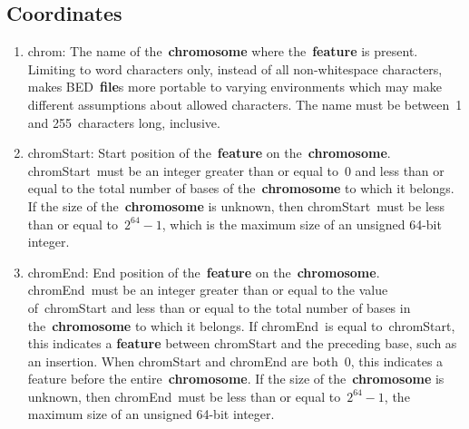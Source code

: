 \documentclass[11pt]{article}
\begin{document}
\subsection{Coordinates}
\begin{enumerate}
\item \textsf{chrom}: The name of the~\textbf{chromosome} where the~\textbf{feature} is present.
  Limiting to word characters only, instead of all non-whitespace characters, makes \ac{BED}~\textbf{file}s more portable to varying environments which may make different assumptions about allowed characters.
  The name must be between~1 and 255~characters long, inclusive.

\item \textsf{chromStart}: Start position of the~\textbf{feature} on the~\textbf{chromosome}.
  \textsf{chromStart}~must be an integer greater than or equal to~0 and less than or equal to the total number of bases of the~\textbf{chromosome} to which it belongs.
  If the size of the~\textbf{chromosome} is unknown, then \textsf{chromStart}~must be less than or equal to~$2^{64} - 1$, which is the maximum size of an unsigned 64-bit integer.

\item \textsf{chromEnd}: End position of the~\textbf{feature} on the~\textbf{chromosome}.
  \textsf{chromEnd}~must be an integer greater than or equal to the value of~\textsf{chromStart} and less than or equal to the total number of bases in the~\textbf{chromosome} to which it belongs.
  If \textsf{chromEnd}~is equal to~\textsf{chromStart}, this indicates a \textbf{feature} between \textsf{chromStart} and the preceding base, such as an insertion.
  When \textsf{chromStart} and \textsf{chromEnd} are both~0, this indicates a feature before the entire~\textbf{chromosome}.
  If the size of the~\textbf{chromosome} is unknown, then \textsf{chromEnd}~must be less than or equal to~$2^{64} - 1$, the maximum size of an unsigned 64-bit integer.
\end{enumerate}
\end{document}
